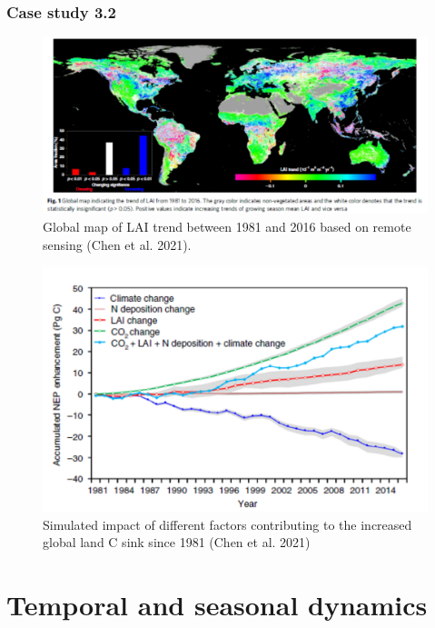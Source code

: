 \documentclass[
  oneside]{book}
\begin{document}
\hypertarget{case-study-3.2}{%
\subsection{Case study 3.2}\label{case-study-3.2}}

\begin{figure}

{\centering \includegraphics[width=0.8\linewidth]{figures/chap3/f334_chen1} 

}

\caption{Global map of LAI trend between 1981 and 2016 based on remote sensing (Chen et al. 2021).}\label{fig:f334}
\end{figure}

\begin{figure}

{\centering \includegraphics[width=0.8\linewidth]{figures/chap3/f335_chen2} 

}

\caption{Simulated impact of different factors contributing to the increased global land C sink since 1981 (Chen et al. 2021) }\label{fig:f335}
\end{figure}

\hypertarget{temporal-and-seasonal-dynamics}{%
\chapter{Temporal and seasonal dynamics}\label{temporal-and-seasonal-dynamics}}
\end{document}
